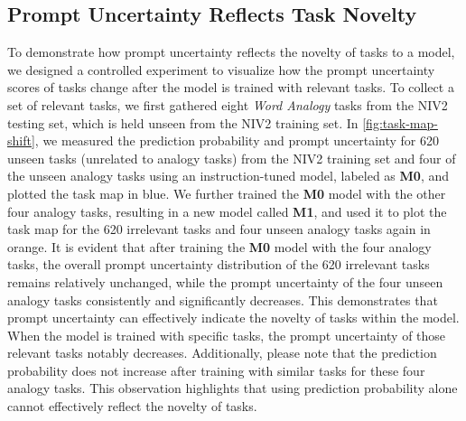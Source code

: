 \subsection{Prompt Uncertainty Reflects Task Novelty}
To demonstrate how prompt uncertainty reflects the novelty of tasks to a model, we designed a controlled experiment to visualize how the prompt uncertainty scores of tasks change after the model is trained with relevant tasks.
To collect a set of relevant tasks, we first gathered eight \textit{Word Analogy} tasks from the NIV2~\cite{Wang2022SuperNaturalInstructionsGV} testing set, which is held unseen from the NIV2 training set. 
In \autoref{fig:task-map-shift}, we measured the prediction probability and prompt uncertainty for 620 unseen tasks (unrelated to analogy tasks) from the NIV2 training set and four of the unseen analogy tasks using an instruction-tuned model, labeled as \textbf{M0}, and plotted the task map in blue. 
We further trained the \textbf{M0} model with the other four analogy tasks, resulting in a new model called \textbf{M1}, and used it to plot the task map for the 620 irrelevant tasks and four unseen analogy tasks again in orange. 
It is evident that after training the \textbf{M0} model with the four analogy tasks, the overall prompt uncertainty distribution of the 620 irrelevant tasks remains relatively unchanged, while the prompt uncertainty of the four unseen analogy tasks consistently and significantly decreases.\footnotemark 
This demonstrates that prompt uncertainty can effectively indicate the novelty of tasks within the model. When the model is trained with specific tasks, the prompt uncertainty of those relevant tasks notably decreases.
Additionally, please note that the prediction probability does not increase after training with similar tasks for these four analogy tasks. This observation highlights that using prediction probability alone cannot effectively reflect the novelty of tasks.

